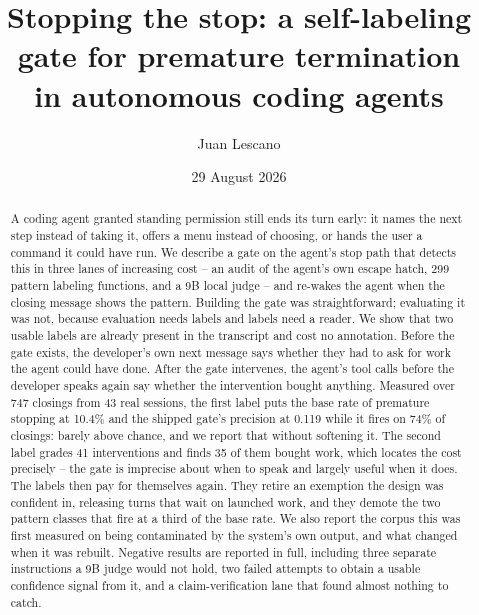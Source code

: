 \documentclass[11pt,a4paper]{article}
\title{Stopping the stop: a self-labeling gate for premature termination\\
       in autonomous coding agents}
\author{Juan Lescano}
\date{29 August 2026}
\begin{document}
\maketitle

\begin{abstract}
A coding agent granted standing permission still ends its turn early: it names
the next step instead of taking it, offers a menu instead of choosing, or hands
the user a command it could have run. We describe a gate on the agent's stop
path that detects this in three lanes of increasing cost -- an audit of the
agent's own escape hatch, 299 pattern labeling functions, and a 9B local judge
-- and re-wakes the agent when the closing message shows the pattern. Building
the gate was straightforward; evaluating it was not, because evaluation needs
labels and labels need a reader. We show that two usable labels are already
present in the transcript and cost no annotation. Before the gate exists, the
developer's own next message says whether they had to ask for work the agent
could have done. After the gate intervenes, the agent's tool calls before the
developer speaks again say whether the intervention bought anything. Measured
over 747 closings from 43 real sessions, the first label puts the base rate of
premature stopping at 10.4\% and the shipped gate's precision at 0.119 while
it fires on 74\% of closings: barely above chance, and we report that without
softening it. The second label grades 41 interventions and finds 35 of them
bought work, which locates the cost precisely -- the gate is imprecise about
when to speak and largely useful when it does. The labels then pay for
themselves again. They retire an exemption the design was confident in,
releasing turns that wait on launched work, and they demote the two pattern
classes that fire at a third of the base rate. We also report the corpus this
was first measured on being contaminated by the system's own output, and what
changed when it was rebuilt. Negative results are reported in full, including
three separate instructions a 9B judge would not hold, two failed attempts to
obtain a usable confidence signal from it, and a claim-verification lane that
found almost nothing to catch.
\end{abstract}
\end{document}
